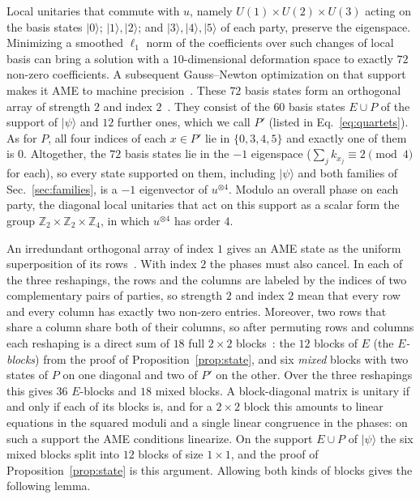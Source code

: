 \documentclass[aps,pra,reprint,superscriptaddress,amsmath,amssymb,longbibliography]{revtex4-2}
\newcommand{\ket}[1]{\lvert #1\rangle}
\theoremstyle{plain}
\begin{document}
Local unitaries that commute with $u$, namely $U(1)\times U(2)\times U(3)$ acting on the basis states
$\ket0$; $\ket1,\ket2$; and $\ket3,\ket4,\ket5$ of each party, preserve the eigenspace.  Minimizing a smoothed $\ell_1$
norm of the coefficients over such changes of local basis can bring a solution with a $10$-dimensional deformation space to exactly $72$
non-zero coefficients. A subsequent Gauss--Newton optimization on that support makes it AME to machine precision~\cite{repo}.  These $72$ basis states form an orthogonal array of strength $2$ and index
$2$~\cite{HSS1999}.
They consist of the $60$ basis states $E\cup P$ of the support of $\ket\psi$ and $12$ further ones, which we call $P'$
(listed in Eq.~\eqref{eq:quartets}).  As for $P$, all four indices of each $x\in P'$ lie in $\{0,3,4,5\}$ and exactly one of them is
$0$.  Altogether, the $72$ basis states lie in the $-1$ eigenspace ($\sum_jk_{x_j}\equiv2\pmod4$ for each), so every state supported on them, including
$\ket\psi$ and both families of Sec.~\ref{sec:families}, is a $-1$ eigenvector of $u^{\otimes4}$.  Modulo an overall
phase on each party, the diagonal local unitaries that act on this support as a scalar form the group
$\mathbb Z_2\times\mathbb Z_2\times\mathbb Z_4$, in which $u^{\otimes4}$ has order $4$.

An irredundant orthogonal array of index $1$ gives an AME state as the uniform superposition of its rows~\cite{GZ2014}.
With index $2$ the phases must also cancel.  In each of the three reshapings, the rows and the columns are labeled by the
indices of two complementary pairs of parties, so strength $2$ and index $2$ mean that every row and every column has exactly two non-zero entries.
Moreover, two rows that share a column share both of their columns, so after permuting rows and columns each reshaping
is a direct sum of $18$ full $2\times2$ blocks~\cite{repo}: the $12$ blocks of $E$ (the \emph{$E$-blocks}) from the
proof of Proposition~\ref{prop:state}, and six \emph{mixed} blocks with two states of $P$ on one diagonal and two of
$P'$ on the other.  Over the three reshapings this gives $36$ $E$-blocks and $18$ mixed blocks.  A
block-diagonal matrix is unitary if and only if each of its blocks is, and for a $2\times2$ block this amounts to
linear equations in the squared moduli and a single linear congruence in the phases: on such a support the AME
conditions linearize.  On the support $E\cup P$ of $\ket\psi$ the six mixed blocks split into $12$ blocks of size
$1\times1$, and the proof of Proposition~\ref{prop:state} is this argument.  Allowing both kinds of blocks gives the
following lemma.
\end{document}
